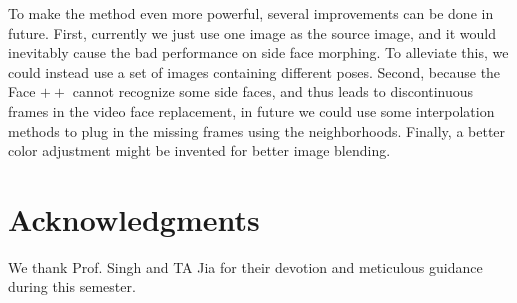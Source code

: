 \documentclass[10pt,twocolumn,letterpaper]{article}
\begin{document}
To make the method even more powerful, several improvements can be done in future. First, currently we just use one image as the source image, and it would inevitably cause the bad performance on side face morphing. To alleviate this, we could instead use a set of images containing different poses. Second, because the Face $++$ cannot recognize some side faces, and thus leads to discontinuous frames in the video face replacement, in future we could use some interpolation methods to plug in the missing frames using the neighborhoods. Finally, a better color adjustment might be invented for better image blending.

{\small
\section*{Acknowledgments}
We thank Prof. Singh and TA Jia for their devotion and meticulous guidance during this semester.
}

{\small


}
\end{document}
